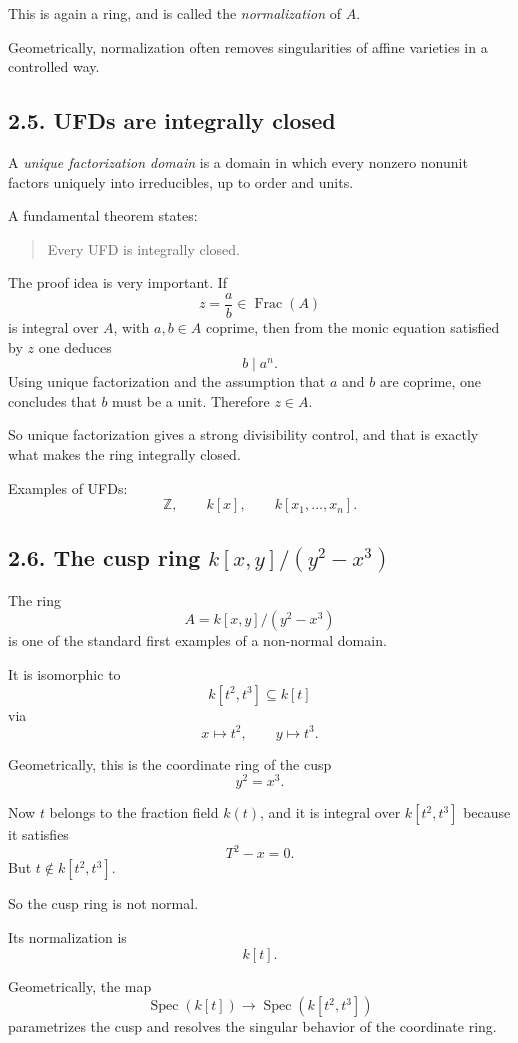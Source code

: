 \documentclass[12pt,a4paper]{article}
\theoremstyle{plain}
\theoremstyle{definition}      %
\begin{document}
This is again a ring, and is called the \emph{normalization} of \(A\).

Geometrically, normalization often removes singularities of affine varieties in a controlled way.

\subsection*{2.5. UFDs are integrally closed}

A \emph{unique factorization domain} is a domain in which every nonzero nonunit factors uniquely into irreducibles, up to order and units.

A fundamental theorem states:
\begin{quote}
	Every UFD is integrally closed.
\end{quote}

The proof idea is very important. If
\[
z=\frac{a}{b}\in \operatorname{Frac}(A)
\]
is integral over \(A\), with \(a,b\in A\) coprime, then from the monic equation satisfied by \(z\) one deduces
\[
b\mid a^n.
\]
Using unique factorization and the assumption that \(a\) and \(b\) are coprime, one concludes that \(b\) must be a unit. Therefore \(z\in A\).

So unique factorization gives a strong divisibility control, and that is exactly what makes the ring integrally closed.

Examples of UFDs:
\[
\mathbb{Z},\qquad k[x],\qquad k[x_1,\dots,x_n].
\]

\subsection*{2.6. The cusp ring \texorpdfstring{$k[x,y]/(y^2-x^3)$}{k[x,y]/(y\string^2-x\string^3)}}

The ring
\[
A=k[x,y]/(y^2-x^3)
\]
is one of the standard first examples of a non-normal domain.

It is isomorphic to
\[
k[t^2,t^3]\subseteq k[t]
\]
via
\[
x\mapsto t^2,\qquad y\mapsto t^3.
\]

Geometrically, this is the coordinate ring of the cusp
\[
y^2=x^3.
\]

Now \(t\) belongs to the fraction field \(k(t)\), and it is integral over \(k[t^2,t^3]\) because it satisfies
\[
T^2-x=0.
\]
But \(t\notin k[t^2,t^3]\).

So the cusp ring is not normal.

Its normalization is
\[
k[t].
\]

Geometrically, the map
\[
\operatorname{Spec}(k[t])\to \operatorname{Spec}(k[t^2,t^3])
\]
parametrizes the cusp and resolves the singular behavior of the coordinate ring.
\end{document}
